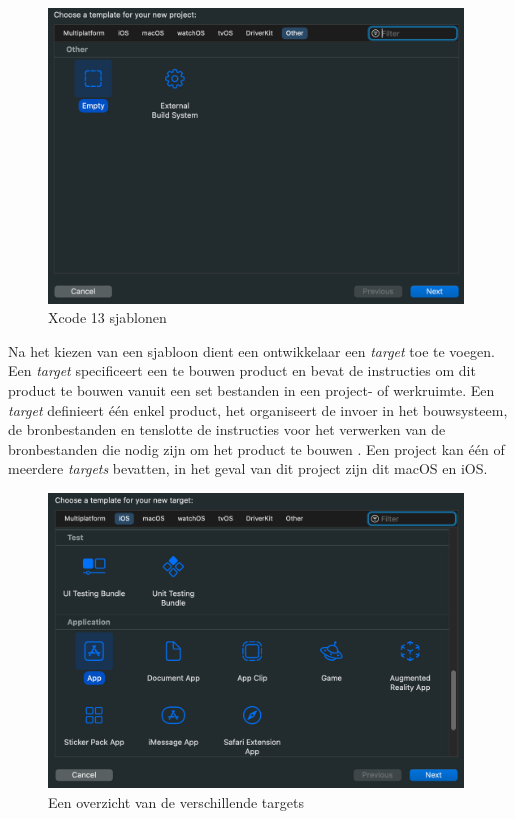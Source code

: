 \begin{figure}[!h]
    \centering
    \includegraphics[width=110mm, scale=0.7]{img/otherproject.png}
    \caption{Xcode 13 sjablonen}
\end{figure}

\pagebreak
Na het kiezen van een sjabloon dient een ontwikkelaar een \textit{target} toe te voegen. Een \textit{target} specificeert een te bouwen product en bevat de instructies om dit product te bouwen vanuit een set bestanden in een project- of werkruimte. Een \textit{target} definieert één enkel product, het organiseert de invoer in het bouwsysteem, de bronbestanden en tenslotte de instructies voor het verwerken van de bronbestanden die nodig zijn om het product te bouwen \autocite{AppleDeveloper2011}. Een project kan één of meerdere \textit{targets} bevatten, in het geval van dit project zijn dit macOS en iOS.
\begin{figure}[!h]
    \centering
    \includegraphics[width=110mm, scale=0.7]{img/iostarget.png}
    \caption{Een overzicht van de verschillende targets}
\end{figure}

